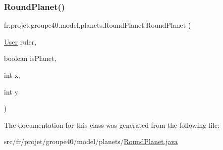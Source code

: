 \subsubsection{\texorpdfstring{Round\+Planet()}{RoundPlanet()}}
{\footnotesize\ttfamily fr.\+projet.\+groupe40.\+model.\+planets.\+Round\+Planet.\+Round\+Planet (\begin{DoxyParamCaption}\item[{\hyperlink{classfr_1_1projet_1_1groupe40_1_1client_1_1_user}{User}}]{ruler,  }\item[{boolean}]{is\+Planet,  }\item[{int}]{x,  }\item[{int}]{y }\end{DoxyParamCaption})}



The documentation for this class was generated from the following file\+:\begin{DoxyCompactItemize}
\item 
src/fr/projet/groupe40/model/planets/\hyperlink{_round_planet_8java}{Round\+Planet.\+java}\end{DoxyCompactItemize}
